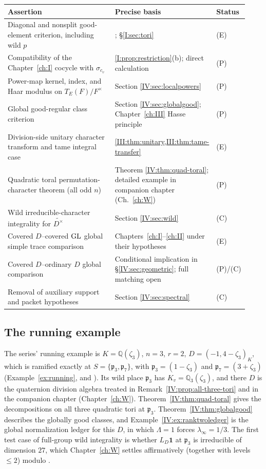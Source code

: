 \begin{center}\small
\begin{tabular}{@{}p{0.49\linewidth}p{0.37\linewidth}p{0.07\linewidth}@{}}
\toprule
Assertion & Precise basis & Status\\\midrule
Diagonal and nonsplit good-element criterion, including wild $p$ & \cite[\S3]{FK86}; \S\ref{I:sec:tori} & (E)\\
Compatibility of the Chapter~\ref{ch:I} cocycle with $\sigma_{c_v}$ & \cref{I:prop:restriction}(b); direct calculation & (P)\\
Power-map kernel, index, and Haar modulus on $T_E(F)/F^\times$ & Section \ref{IV:sec:localpowers} & (P)\\
Global good-regular class criterion & Section \ref{IV:sec:globalgood}; Chapter~\ref{ch:III} Hasse principle & (P)\\
Division-side unitary character transform and tame integral case & \cref{III:thm:unitary,III:thm:tame-transfer} & (E)\\
Quadratic toral permutation-character theorem (all odd $n$) & Theorem \ref{IV:thm:quad-toral}; detailed example in companion chapter (Ch.~\ref{ch:W}) & (P)\\
Wild irreducible-character integrality for $\widetilde{D^\times}$ & Section \ref{IV:sec:wild} & (C)\\
Covered $D$--covered $\operatorname{GL}$ global simple trace comparison & Chapters~\ref{ch:I}--\ref{ch:II} under their hypotheses & (E)\\
Covered $D$--ordinary $D$ global comparison & Conditional implication in \S\ref{IV:sec:geometric}; full matching open & (P)/(C)\\
Removal of auxiliary support and packet hypotheses & Section \ref{IV:sec:spectral} & (C)\\
\bottomrule
\end{tabular}
\end{center}

\subsection*{The running example}
The series' running example is $K=\mathbb{Q}(\zeta_3)$, $n=3$, $r=2$, $D=(-1,4-\zeta_3)_K$, which is ramified exactly at $S=\{\mathfrak p_3,\mathfrak p_7\}$, with $\mathfrak p_3=(1-\zeta_3)$ and $\mathfrak p_7=(3+\zeta_3)$ (Example~\ref{ex:running}, and \cite{JC26b}). Its wild place $\mathfrak p_3$ has $K_v=\mathbb{Q}_3(\zeta_3)$, and there $D$ is the quaternion division algebra treated in Remark~\ref{IV:prop:all-three-tori} and in the companion chapter (Chapter~\ref{ch:W}). Theorem~\ref{IV:thm:quad-toral} gives the decompositions on all three quadratic tori at $\mathfrak p_3$. Theorem~\ref{IV:thm:globalgood} describes the globally good classes, and Example~\ref{IV:ex:ranktwoledger} is the global normalization ledger for this $D$, in which $\Lambda=1$ forces $\lambda_\infty=1/3$. The first test case of full-group wild integrality is whether $L_D\mathbf 1$ at $\mathfrak p_3$ is irreducible of dimension $27$, which Chapter~\ref{ch:W} settles affirmatively (together with levels $\le2$) modulo \Pctag.

